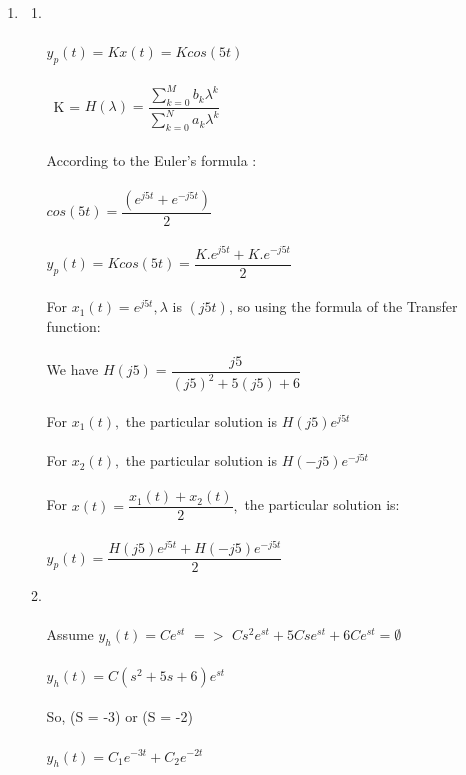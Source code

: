 \documentclass[10pt,a4paper, margin=1in]{article}
\begin{document}
\begin{enumerate}
\item %
    \begin{enumerate}
        \item %
        \\\\ $y_p(t) = Kx(t) = Kcos(5t)$
        \\\\\ K = $ H(\lambda) = \dfrac{\sum_{k=0}^{M}{b_k \lambda^{k}}}{\sum_{k=0}^{N}{a_k \lambda^{k}}}$
        \\\\ According to the Euler's formula :
        \\\\ $cos(5t) = \dfrac{(e^{j5t} + e^{-j5t})}{2}$
        \\\\ $y_p(t) = Kcos(5t) = \dfrac{K.e^{j5t} + K.e^{-j5t}}{2}$
        \\\\ For $x_1(t) = e^{j5t}, \lambda $ is $(j5t)$, so using the formula of the Transfer function:
        \\\\ We have $H(j5) = \dfrac{j5}{(j5)^2 + 5(j5) + 6}$
        \\\\ For $x_1(t),$ the particular solution is $H(j5)e^{j5t}$ 
        \\\\ For $x_2(t),$ the particular solution is $H(-j5)e^{-j5t}$
        \\\\ For $x(t) = \dfrac{x_1(t) + x_2(t)}{2},$ the particular solution is:
        \\\\ $y_p(t) = \dfrac{H(j5)e^{j5t} + H(-j5)e^{-j5t}}{2}$
        \\
        \item %
        \\\\ Assume $y_h(t) = Ce^{st} $  $ => $  $ Cs^{2}e^{st} + 5Cse^{st} + 6Ce^{st} = \emptyset $
        \\\\ $y_h(t) = C (s^{2} + 5s + 6)e^{st} $
        \\\\ So, (S = -3) or (S = -2)
        \\\\ $y_h(t) = C_1e^{-3t} +  C_2e^{-2t} $

\end{enumerate}
\end{enumerate}
\end{document}
